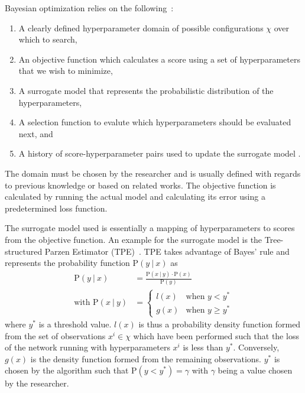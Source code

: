 Bayesian optimization relies on the following~\cite{bayesiantds}:
\begin{enumerate}
	\itemsep-1em
	\item A clearly defined hyperparameter domain of possible configurations $\chi$ over which to search,
	\item An objective function which calculates a score using a set of hyperparameters that we wish to minimize,
	\item A surrogate model that represents the probabilistic distribution of the hyperparameters,
	\item A selection function to evalute which hyperparameters should be evaluated next, and
	\item A history of score-hyperparameter pairs used to update the surrogate model .
\end{enumerate}
The domain must be chosen by the researcher and is usually defined with regards to previous knowledge or based on related works.
The objective function is calculated by running the actual model and calculating its error using a predetermined loss function.

The surrogate model used is essentially a mapping of hyperparameters to scores from the objective function.
An example for the surrogate model is the Tree-structured Parzen Estimator (TPE)~\cite{tpe}.
TPE takes advantage of Bayes' rule and represents the probability function $\text{P}(y~|~x)$ as
\begin{align}\label{eq:bohb-1}
	\text{P}(y~|~x) &= \frac{\text{P}(x~|~y) \cdot \text{P}(x)}{\text{P}(y)}\\
	\text{with } \text{P}(x~|~y) &=
	\begin{cases}
	l(x) &\text{when } y < y^* \\
	g(x) &\text{when } y \geq y^*
	\end{cases}
\end{align}
where $y^*$ is a threshold value. $l(x)$ is thus a probability density function formed from the set of observations $x^i \in \chi$ which have been performed such that the loss of the network running with hyperparameters $x^i$ is less than $y^*$. 
Conversely, $g(x)$ is the density function formed from the remaining observations.
$y^*$ is chosen by the algorithm such that $\text{P}(y<y^*) = \gamma$ with $\gamma$ being a value chosen by the researcher.

